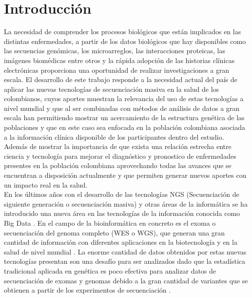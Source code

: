 \chapter{Introducci\'{o}n}

La necesidad de comprender los procesos biológicos que están implicados en las distintas enfermedades, a partir de los datos biológicos que hay disponibles como las secuencias genómicas, los microarreglos, las interacciones proteicas, las imágenes biomédicas entre otros y la rápida adopción de las historias clínicas electrónicas proporciona una oportunidad de realizar investigaciones a gran escala. El desarrollo de este trabajo responde a la necesidad actual del país de aplicar  las nuevas tecnologías de secuenciación masiva en la salud de los colombianos, cuyos aportes muestran la relevancia del uso de estas tecnologías a nivel mundial y que al ser combinadas con métodos de análisis de datos a gran escala han permitiendo mostrar un acercamiento de la estructura genética de las poblaciones y que en este caso sea enfocada en la población colombiana asociada a la información clínica disponible de los participantes dentro del estudio.\\

Además de mostrar la importancia de que exista una relación estrecha entre ciencia y tecnología para mejorar el diagnóstico y pronostico de enfermedades presentes en la población colombiana aprovechando todas las avances que se encuentran a disposición actualmente y que permiten generar nuevos aportes con un impacto real en la salud.\\

En los últimos años con el desarrollo de las tecnologías NGS (Secuenciación de siguiente generación o secuenciación masiva) y otras áreas de la informática se ha introducido una nueva área en las tecnologías de la información conocida como Big Data \cite{Mohammed2014}. En el campo de la bioinformática en concreto es el exoma o secuenciación del genoma completo (WES o WGS), que generan una gran cantidad de información con diferentes aplicaciones en la biotecnología y en la  salud de nivel mundial \cite{Hwang2015}. La enorme cantidad de datos obtenidos por estas nuevas tecnologías presentan son una desafío para ser analizados dado que la estadística tradicional aplicada en genética es poco efectiva para analizar datos de secuenciación de exomas y genomas debido a la gran cantidad de variantes que se obtienen a partir de los experimentos de secuenciación \cite{Wu2014,Mohammed2014}.\\

